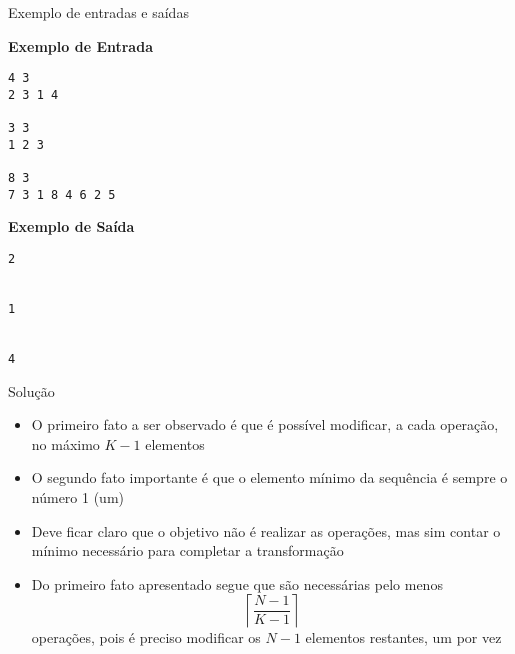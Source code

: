 \begin{frame}[fragile]{Exemplo de entradas e saídas}

\begin{minipage}[t]{0.5\textwidth}
\textbf{Exemplo de Entrada}
\begin{verbatim}
4 3
2 3 1 4

3 3
1 2 3

8 3
7 3 1 8 4 6 2 5
\end{verbatim}
\end{minipage}
\begin{minipage}[t]{0.45\textwidth}
\textbf{Exemplo de Saída}
\begin{verbatim}
2


1


4
\end{verbatim}
\end{minipage}
\end{frame}

\begin{frame}[fragile]{Solução}

    \begin{itemize}
        \item O primeiro fato a ser observado é que é possível modificar, a cada operação, no
            máximo $K - 1$ elementos

        \item O segundo fato importante é que o elemento mínimo da sequência é sempre o número
            1 (um)

        \item Deve ficar claro que o objetivo não é realizar as operações, mas sim contar o
            mínimo necessário para completar a transformação

        \item Do primeiro fato apresentado segue que são necessárias pelo menos 
        \[
            \left\lceil \frac{N - 1}{K - 1} \right\rceil
        \] operações,  pois é preciso modificar os $N - 1$ elementos restantes, um por vez
    \end{itemize}

\end{frame}


